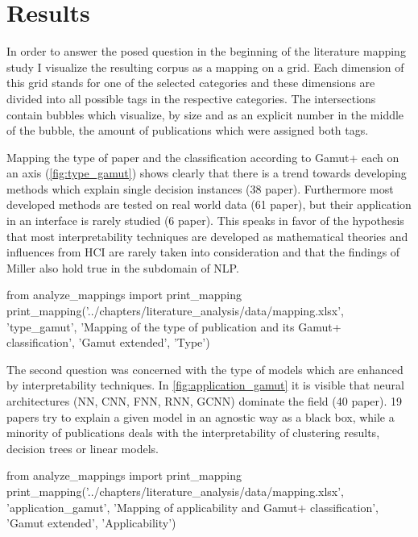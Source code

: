 \section{Results}

In order to answer the posed question in the beginning of the literature mapping study I visualize the resulting corpus as a mapping on a grid. Each dimension of this grid stands for one of the selected categories and these dimensions are divided into all possible tags in the respective categories. The intersections contain bubbles which visualize, by size and as an explicit number in the middle of the bubble, the amount of publications which were assigned both tags.

Mapping the type of paper and the classification according to Gamut+ each on an axis (\autoref{fig:type_gamut}) shows clearly that there is a trend towards developing methods which explain single decision instances (38 paper). Furthermore most developed methods are tested on real world data (61 paper), but their application in an interface is rarely studied (6 paper). This speaks in favor of the hypothesis that most interpretability techniques are developed as mathematical theories and influences from HCI are rarely taken into consideration and that the findings of Miller \cite{millerExplainableAIBeware2017} also hold true in the subdomain of NLP.

\begin{pycode}
from analyze_mappings import print_mapping
print_mapping('../chapters/literature_analysis/data/mapping.xlsx', 'type_gamut', 'Mapping of the type of publication and its Gamut+ classification', 'Gamut extended', 'Type')
\end{pycode}

The second question was concerned with the type of models which are enhanced by interpretability techniques. In \autoref{fig:application_gamut} it is visible that neural architectures (NN, CNN, FNN, RNN, GCNN) dominate the field (40 paper). 19 papers try to explain a given model in an agnostic way as a black box, while a minority of publications deals with the interpretability of clustering results, decision trees or linear models.

\begin{pycode}
from analyze_mappings import print_mapping
print_mapping('../chapters/literature_analysis/data/mapping.xlsx', 'application_gamut', 'Mapping of applicability and Gamut+ classification', 'Gamut extended', 'Applicability')
\end{pycode}


